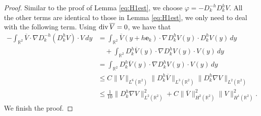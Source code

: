 \documentclass[12pt]{amsart}
\renewcommand{\div}{{\rm div \thinspace }}
\numberwithin{equation}{section}              %
\theoremstyle{remark}
\begin{document}
		\begin{proof}
        Similar to the proof of   Lemma \ref{eq:H1est}, we choose $\varphi=- D_{k}^{-h}D_{k}^{h}V$.  All the other terms are identical to those in
         Lemma \ref{eq:H1est}, 
			we only need to deal with the following term. Using $\div \overline{V}=0$, we have that
			\begin{equation*}
				\begin{aligned}
					-\int_{\mathbb{R}^{2}} \overline{V}\cdot \nabla D_{k}^{-h}(D_{k}^{h}V) \cdot V \, dy &= \int_{\mathbb{R}^{2}} \overline{V}(y + h\mathbf{e}_{k}) \cdot \nabla D_{k}^{h}V(y) \cdot D_{k}^{h}V(y) \, dy \\
					&\quad + \int_{\mathbb{R}^{2}} D_{k}^{h} \overline{V}(y) \cdot \nabla D_{k}^{h}V(y) \cdot V(y) \, dy \\
					&= \int_{\mathbb{R}^{2}} D_{k}^{h} \overline{V}(y) \cdot \nabla D_{k}^{h}V(y) \cdot V(y) \, dy\\
					&\leq C \|V\|_{L^{6}(\mathbb{R}^{2})} \|D_{k}^{h}\overline{V}\|_{L^{3}(\mathbb{R}^{2})} \|D_{k}^{h}\nabla V\|_{L^{2}(\mathbb{R}^{2})} \\
					&\leq \frac{1}{10}\|D_{k}^{h}\nabla V\|_{L^{2}(\mathbb{R}^{2})}^2  + C \|\overline{V}\|_{H^2(\mathbb{R}^{2})}^2\|V\|_{H^1(\mathbb{R}^{2})}^2.
				\end{aligned}
			\end{equation*}
            We finish the proof.
		\end{proof}
		
\end{document}
